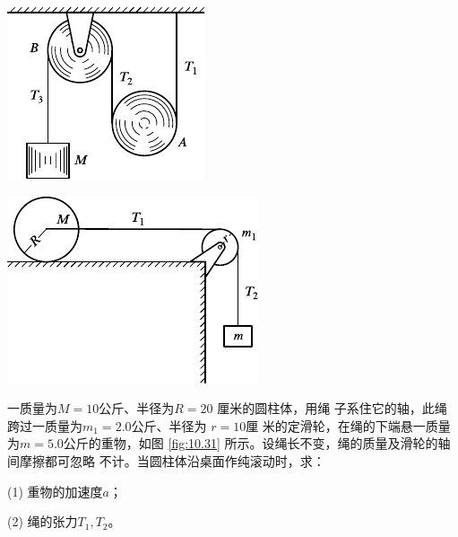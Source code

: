 \begin{exercises}
\begin{figurex}
    \begin{minipage}[b]{0.4\linewidth}
        \centering
        \includegraphics{figure/fig10.30}
        \caption{}
        \label{fig:10.30}
    \end{minipage}
    \begin{minipage}[b]{0.6\linewidth}
        \centering
        \includegraphics{figure/fig10.31}
        \caption{}
        \label{fig:10.31}
    \end{minipage}
\end{figurex}

\exercise 一质量为$  M = 1 0   $公斤、半径为$  R = 2 0  $ 厘米的圆柱体，用绳
子系住它的轴，此绳跨过一质量为$  m _ { 1 } = 2 . 0   $公斤、半径为 $ r = 1 0   $厘
米的定滑轮，在绳的下端悬一质量为$  m = 5 . 0   $公斤的重物，如图
\ref{fig:10.31} 所示。设绳长不变，绳的质量及滑轮的轴间摩擦都可忽略
不计。当圆柱体沿桌面作纯滚动时，求：

\clearpage
(1) 重物的加速度$ a $；

(2) 绳的张力$  T _ { 1 } , T _ { 2 }  $。


\end{exercises}
